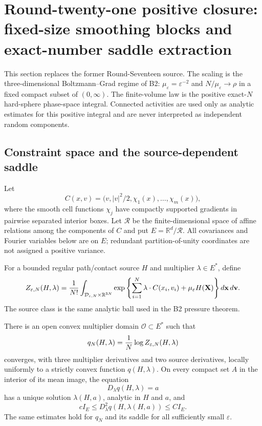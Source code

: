 \section{Round-twenty-one positive closure: fixed-size smoothing blocks and exact-number saddle extraction}
\label{sec:r21-b1}

This section replaces the former Round-Seventeen source.  The scaling is the
three-dimensional Boltzmann--Grad regime of B2:
$\mu_\varepsilon=\varepsilon^{-2}$ and
$N/\mu_\varepsilon\to\rho$ in a fixed compact subset of $(0,\infty)$.  The
finite-volume law is the positive exact-$N$ hard-sphere phase-space integral.
Connected activities are used only as analytic estimates for this positive
integral and are never interpreted as independent random components.

\subsection{Constraint space and the source-dependent saddle}

Let
\[
 C(x,v)=\bigl(v,|v|^2/2,\chi_1(x),\ldots,\chi_m(x)\bigr),
\]
where the smooth cell functions $\chi_j$ have compactly supported gradients in
pairwise separated interior boxes.  Let $\mathcal R$ be the finite-dimensional
space of affine relations among the components of $C$ and put
$E=\mathbb R^d/\mathcal R$.  All covariances and Fourier variables below are
on $E$; redundant partition-of-unity coordinates are not assigned a positive
variance.

For a bounded regular path/contact source $H$ and multiplier
$\lambda\in E^*$, define
\[
 Z_{\varepsilon,N}(H,\lambda)=
 {1\over N!}\int_{\mathcal D_{\varepsilon,N}\times\mathbb R^{3N}}
 \exp\left\{\sum_{i=1}^N\lambda\cdot C(x_i,v_i)
              +\mu_\varepsilon H(\mathbf X)\right\}
 d\mathbf x\,d\mathbf v .
\]
The source class is the same analytic ball used in the B2 pressure theorem.

\begin{theorem}
\label{thm:r21-b1-saddle}
There is an open convex multiplier domain $\mathcal O\subset E^*$ such that
\[
 q_N(H,\lambda)={1\over N}\log Z_{\varepsilon,N}(H,\lambda)
\]
converges, with three multiplier derivatives and two source derivatives,
locally uniformly to a strictly convex function $q(H,\lambda)$.  On every
compact set $A$ in the interior of its mean image, the equation
\[
 D_\lambda q(H,\lambda)=a
\]
has a unique solution $\lambda(H,a)$, analytic in $H$ and $a$, and
\[
 cI_E\le D_\lambda^2q(H,\lambda(H,a))\le CI_E.
\]
The same estimates hold for $q_N$ and its saddle for all sufficiently small
$\varepsilon$.
\end{theorem}

